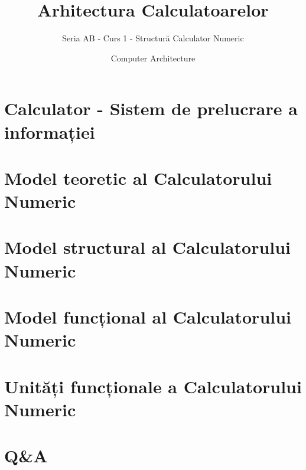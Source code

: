 \documentclass[usenames,dvipsnames]{beamer}             %
\title[Computer Architecture] %
{Arhitectura Calculatoarelor}
\subtitle{Seria AB - Curs 1 - Structură Calculator Numeric}
\author[Ștefan-Dan Ciocîrlan] %
{}
\institute[NUSTPB] %
{
  \inst{}%
  National University of Science and Technology\\
  POLITEHNICA Bucharest
}
\date[NUSTPB 2025] %
{Computer Architecture}
\begin{document}
\frame{\titlepage}


\section{Calculator - Sistem de prelucrare a informației}


\section{Model teoretic al Calculatorului Numeric}


\section{Model structural al Calculatorului Numeric}


\section{Model funcțional al Calculatorului Numeric}


\section{Unități funcționale a Calculatorului Numeric}


\section{Q\&A}
\begin{frame}
\end{frame}

\end{document}
